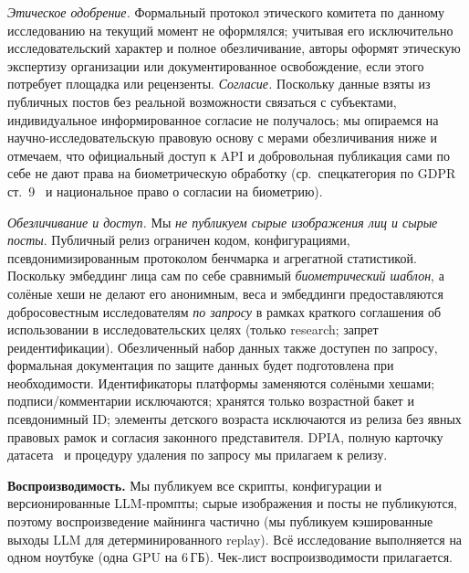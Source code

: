 \documentclass[10pt,twocolumn,letterpaper]{article}
\begin{document}
\emph{Этическое одобрение.} Формальный протокол этического комитета по данному исследованию на текущий
момент не оформлялся; учитывая его исключительно исследовательский характер и полное обезличивание,
авторы оформят этическую экспертизу организации или документированное освобождение, если этого потребует
площадка или рецензенты. \emph{Согласие.} Поскольку данные взяты из публичных постов без реальной
возможности связаться с субъектами, индивидуальное информированное согласие не получалось; мы опираемся
на научно-исследовательскую правовую основу с мерами обезличивания ниже и отмечаем, что официальный доступ
к API и добровольная публикация сами по себе не дают права на биометрическую обработку (ср.\ спецкатегория
по GDPR ст.~9~\cite{gdpr2016} и национальное право о согласии на биометрию).

\emph{Обезличивание и доступ.} Мы \emph{не публикуем сырые изображения лиц и сырые посты}. Публичный релиз
ограничен кодом, конфигурациями, псевдонимизированным протоколом бенчмарка и агрегатной статистикой.
Поскольку эмбеддинг лица сам по себе сравнимый \emph{биометрический шаблон}, а солёные хеши не делают его
анонимным, веса и эмбеддинги предоставляются добросовестным исследователям \emph{по запросу} в рамках
краткого соглашения об использовании в исследовательских целях (только research; запрет реидентификации).
Обезличенный набор данных также доступен по запросу, формальная документация по защите данных будет
подготовлена при необходимости. Идентификаторы платформы заменяются солёными хешами; подписи/комментарии
исключаются; хранятся только возрастной бакет и псевдонимный ID; элементы детского возраста исключаются из
релиза без явных правовых рамок и согласия законного представителя. DPIA, полную карточку
датасета~\cite{gebru2021datasheets} и процедуру удаления по запросу мы прилагаем к релизу.

\textbf{Воспроизводимость.} Мы публикуем все скрипты, конфигурации и версионированные LLM-промпты; сырые
изображения и посты не публикуются, поэтому воспроизведение майнинга частично (мы публикуем кэшированные
выходы LLM для детерминированного replay). Всё исследование выполняется на одном ноутбуке (одна GPU на
6\,ГБ). Чек-лист воспроизводимости прилагается.



\end{document}
